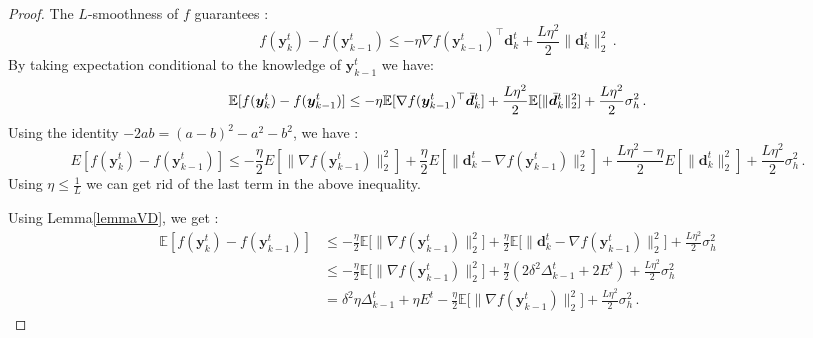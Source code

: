\documentclass[10pt]{article} %
\theoremstyle{plain}
\theoremstyle{definition}
\theoremstyle{remark}
\newcommand{\norm}[1]{\|#1\|_2}
\def\vd{{\bm{d}}}
\def\vy{{\bm{y}}}
\newcommand{\E}{\mathbb{E}}
\begin{document}
\begin{proof}
The $L$-smoothness of $f$ guarantees :
$$f(\vy^t_k) - f(\vy^t_{k-1}) \leq - \eta\nabla f(\vy^t_{k-1})^\top \vd^t_k + \frac{L\eta^2}{2}\norm{\vd^t_k}^2\, .$$
By taking expectation conditional to the knowledge of $\vy^t_{k-1}$ we have:
$$\E[f(\vy^t_k) - f(\vy^t_{k-1})] \leq - \eta\E[\nabla f(\vy^t_{k-1})^\top \Bar{\vd}^t_k] + \frac{L\eta^2}{2}\E[\norm{\Bar{\vd}^t_k}^2] + \frac{L\eta^2}{2}\sigma_h^2\, .$$
Using the identity $-2ab = (a - b)^2 - a^2 - b^2$, we have : $$E[f(\vy^t_k) - f(\vy^t_{k-1})] \leq - \frac{\eta}{2} E[\norm{\nabla f(\vy^t_{k-1})}^2] + \frac{\eta}{2} E[\norm{\vd^t_k - \nabla f(\vy^t_{k-1})}^2] + \frac{L\eta^2 - \eta}{2}E[\norm{\vd^t_k}^2] + \frac{L\eta^2}{2}\sigma_h^2\, . $$
Using $\eta\leq \frac{1}{L}$ we can get rid of the last term in the above inequality.

Using Lemma\ref{lemmaVD}, we get : 
\begin{align*}
    \E[f(\vy^t_k) - f(\vy^t_{k-1})] &\leq - \frac{\eta}{2} \E\big[\norm{\nabla f(\vy^t_{k-1})}^2\big] + \frac{\eta}{2} \E\big[\norm{\vd^t_k - \nabla f(\vy^t_{k-1})}^2\big] + \frac{L\eta^2}{2}\sigma_h^2\\
    &\leq - \frac{\eta}{2} \E\big[\norm{\nabla f(\vy^t_{k-1})}^2\big] + \frac{\eta}{2}(2\delta^2 \Delta^t_{k-1} + 2 E^t) + \frac{L\eta^2}{2}\sigma_h^2\\
    &= \delta^2 \eta \Delta^t_{k-1} + \eta E^t - \frac{\eta}{2} \E\big[\norm{\nabla f(\vy^t_{k-1})}^2\big] + \frac{L\eta^2}{2}\sigma_h^2\, .
\end{align*}


\end{proof}
\end{document}
